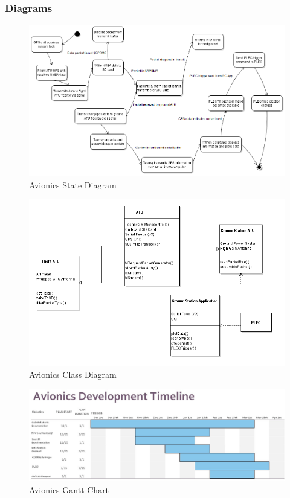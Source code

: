 \documentclass[onecolumn, draftclsnofoot, 10pt, compsoc]{IEEEtran}
\begin{document}
\subsubsection{Diagrams}
\vspace{1cm}
\begin{figure}[ht]
    \centering
    \includegraphics[width = 0.9 \textwidth,angle=0]{Figures/avionicsStateDiagram.png}
    \caption{Avionics State Diagram}
    \label{fig:Avionics SD}
\end{figure}

\begin{figure}[ht]
    \centering
    \includegraphics[width = 1 \textwidth,angle=0]{Figures/ATUclassDiagram.png}
    \caption{Avionics Class Diagram}
    \label{fig:Avionics CD}
\end{figure}

\newpage
\begin{figure}[ht]
    \centering
    \includegraphics[width = 0.95 \textwidth,angle=0]{Figures/ganttATU.JPG}
    \caption{Avionics Gantt Chart}
    \label{fig:Avionics Gantt}
\end{figure}
\end{document}
